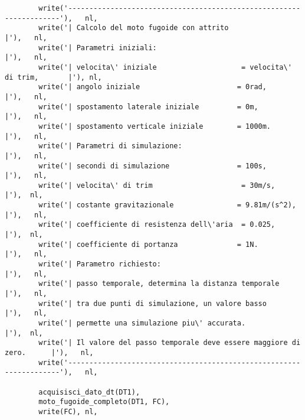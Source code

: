 \begin{verbatim}
        write('--------------------------------------------------------------------'),   nl,
        write('| Calcolo del moto fugoide con attrito                             |'),   nl,
        write('| Parametri iniziali:                                              |'),   nl,
        write('| velocita\' iniziale                    = velocita\' di trim,       |'), nl,
        write('| angolo iniziale                       = 0rad,                    |'),   nl,
        write('| spostamento laterale iniziale         = 0m,                      |'),   nl,
        write('| spostamento verticale iniziale        = 1000m.                   |'),   nl,
        write('| Parametri di simulazione:                                        |'),   nl,
        write('| secondi di simulazione                = 100s,                    |'),   nl,
        write('| velocita\' di trim                     = 30m/s,                   |'),  nl,
        write('| costante gravitazionale               = 9.81m/(s^2),             |'),   nl,
        write('| coefficiente di resistenza dell\'aria  = 0.025,                   |'),  nl,
        write('| coefficiente di portanza              = 1N.                      |'),   nl,
        write('| Parametro richiesto:                                             |'),   nl,
        write('| passo temporale, determina la distanza temporale                 |'),   nl,
        write('| tra due punti di simulazione, un valore basso                    |'),   nl,
        write('| permette una simulazione piu\' accurata.                          |'),  nl,
        write('| Il valore del passo temporale deve essere maggiore di zero.      |'),   nl,
        write('--------------------------------------------------------------------'),   nl,

        acquisisci_dato_dt(DT1),                                                       
        moto_fugoide_completo(DT1, FC),
        write(FC), nl,


\end{verbatim}
